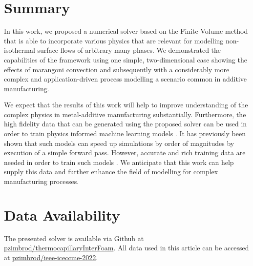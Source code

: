 \documentclass[conference,final]{IEEEtran}
\begin{document}
\section{Summary}

In this work, we proposed a numerical solver based on the Finite Volume method that is able to incorporate various physics that are relevant for modelling non-isothermal surface flows of arbitrary many phases. We demonstrated the capabilities of the framework using one simple, two-dimensional case showing the effects of marangoni convection and subsequently with a considerably more complex and application-driven process modelling a scenario common in additive manufacturing.

We expect that the results of this work will help to improve understanding of the complex physics in metal-additive manufacturing substantially. Furthermore, the high fidelity data that can be generated using the proposed solver can be used in order to train physics informed machine learning models \cite{karniadakisPhysicsinformedMachineLearning2021}. It has previously been shown that such models can speed up simulations by order of magnitudes by execution of a simple forward pass. However, accurate and rich training data are needed in order to train such models \cite{liFourierNeuralOperator2021,luDeepONetLearningNonlinear2020}. We anticipate that this work can help supply this data and further enhance the field of modelling for complex manufacturing processes.

\section{Data Availability}\label{sec:data}

The presented solver is available via Github at \href{https://github.com/pzimbrod/thermocapillaryInterFoam}{pzimbrod/thermocapillaryInterFoam}. All data used in this article can be accessed at \href{https://github.com/pzimbrod/ieee-iceccme-2022}{pzimbrod/ieee-iceccme-2022}.



\end{document}
